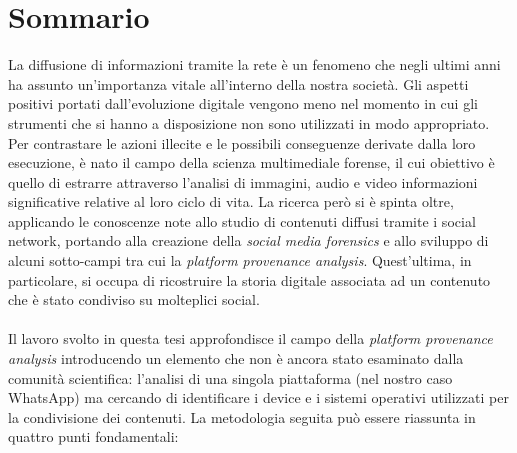 \chapter*{Sommario} %
\label{sommario}

La diffusione di informazioni tramite la rete è un fenomeno che negli ultimi anni ha assunto un'importanza vitale all'interno della nostra società. Gli aspetti positivi portati dall'evoluzione digitale vengono meno nel momento in cui gli strumenti che si hanno a disposizione non sono utilizzati in modo appropriato. Per contrastare le azioni illecite e le possibili conseguenze derivate dalla loro esecuzione, è nato il campo della scienza multimediale forense, il cui obiettivo è quello di estrarre attraverso l'analisi di immagini, audio e video informazioni significative relative al loro ciclo di vita. La ricerca però si è spinta oltre, applicando le conoscenze note allo studio di contenuti diffusi tramite i social network, portando alla creazione della \textit{social media forensics} e allo sviluppo di alcuni sotto-campi tra cui la \textit{platform provenance analysis}. Quest'ultima, in particolare, si occupa di ricostruire la storia digitale associata ad un contenuto che è stato condiviso su molteplici social.\\\\
Il lavoro svolto in questa tesi approfondisce il campo della \textit{platform provenance analysis} introducendo un elemento che non è ancora stato esaminato dalla comunità scientifica: l'analisi di una singola piattaforma (nel nostro caso WhatsApp) ma cercando di identificare i device e i sistemi operativi utilizzati per la condivisione dei contenuti. La metodologia seguita può essere riassunta in quattro punti fondamentali:

